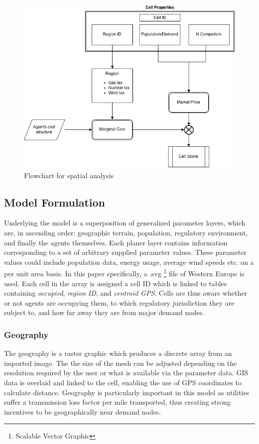 \documentclass[12pt]{article}
\begin{document}
\begin{figure}[ht!]
	\begin{center}
	\includegraphics[scale=.5]{spatial_flow}
	\caption{Flowchart for spatial analysis}
	\end{center}
\end{figure}

\subsection{Model Formulation}
Underlying the model is a superposition of generalized parameter layers, which are, in ascending order: geographic terrain, population, regulatory environment, and finally the agents themselves. Each planer layer contains information corresponding to a set of arbitrary supplied parameter values. These parameter values could include population data, energy usage, average wind speeds etc. on a per unit area basis. In this paper specifically, a .svg \footnote{Scalable Vector Graphic} file of Western Europe is used. Each cell in the array is assigned a cell ID which is linked to tables containing \emph{occupied}, \emph{region ID}, and \emph{centroid GPS}. Cells are thus aware whether or not agents are occupying them, to which regulatory jurisdiction they are subject to, and how far away they are from major demand nodes. \*

\subsubsection{Geography}
The geography is a raster graphic which produces a discrete array from an imported image. The the size of the mesh can be adjusted depending on the resolution required by the user or what is available via the parameter data. GIS data is overlaid and linked to the cell, enabling the use of GPS coordinates to calculate distance. Geography is particularly important in this model as utilities suffer a transmission loss factor per mile transported, thus creating strong incentives to be geographically near demand nodes.
\end{document}
